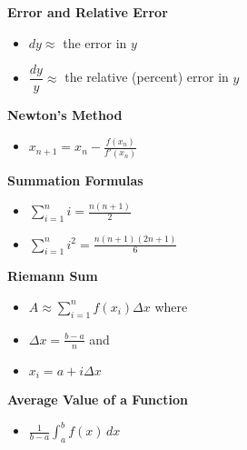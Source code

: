 \documentclass[12pt]{exam}
\newcommand{\ds}{\displaystyle}
\begin{document}
\noindent
\textbf{Error and Relative Error} ~
\begin{itemize}
\item $dy \approx$ the error in $y$
\bigskip
\item $\dfrac{dy}{y} \approx$ the relative (percent) error in $y$
\bigskip
\end{itemize}

\noindent
\textbf{Newton's Method} ~
\begin{itemize}
\item $\ds x_{n+1} = x_n - \frac{f(x_n)}{f'(x_n)}$
\bigskip
\end{itemize}

\noindent
\textbf{Summation Formulas} ~
\begin{itemize}
\item $\ds \sum_{i = 1}^n i = \frac{n(n+1)}{2}$
\item $\ds \sum_{i = 1}^n i^2 = \frac{n(n+1)(2n+1)}{6}$
\bigskip
\end{itemize}

\noindent
\textbf{Riemann Sum} ~
\begin{itemize}
\item $\ds A \approx \sum_{i = 1}^n f(x_i) \Delta x$ where
\item $\ds \Delta x = \frac{b-a}{n}$ and 
\item $\ds x_i = a + i \Delta x$
\bigskip
\end{itemize}

\noindent
\textbf{Average Value of a Function} ~
\begin{itemize}
\item $\ds \frac{1}{b-a}\int_a^b f(x) \, dx$
\bigskip
\end{itemize}
\end{document}
